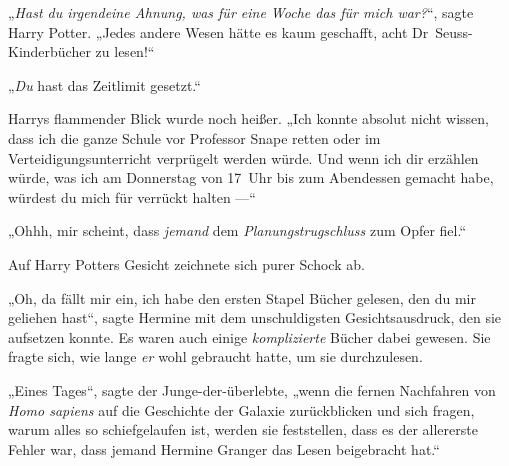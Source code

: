 „\emph{Hast du irgendeine Ahnung, was für eine Woche das für mich war?}“, sagte Harry Potter.
„Jedes andere Wesen hätte es kaum geschafft, acht Dr~Seuss-Kinderbücher zu lesen!“

„\emph{Du} hast das Zeitlimit gesetzt.“

Harrys flammender Blick wurde noch heißer.
„Ich konnte absolut nicht wissen, dass ich die ganze Schule vor Professor Snape retten oder im Verteidigungsunterricht verprügelt werden würde. Und wenn ich dir erzählen würde, was ich am Donnerstag von 17~Uhr bis zum Abendessen gemacht habe, würdest du mich für verrückt halten —“

„Ohhh, mir scheint, dass \emph{jemand} dem \emph{Planungstrugschluss} zum Opfer fiel.“

Auf Harry Potters Gesicht zeichnete sich purer Schock ab.

„Oh, da fällt mir ein, ich habe den ersten Stapel Bücher gelesen, den du mir geliehen hast“, sagte Hermine mit dem unschuldigsten Gesichtsausdruck, den sie aufsetzen konnte. Es waren auch einige \emph{komplizierte} Bücher dabei gewesen. Sie fragte sich, wie lange \emph{er} wohl gebraucht hatte, um sie durchzulesen.

„Eines Tages“, sagte der Junge-der-überlebte, „wenn die fernen Nachfahren von \emph{Homo sapiens} auf die Geschichte der Galaxie zurückblicken und sich fragen, warum alles so schiefgelaufen ist, werden sie feststellen, dass es der allererste Fehler war, dass jemand Hermine Granger das Lesen beigebracht hat.“


